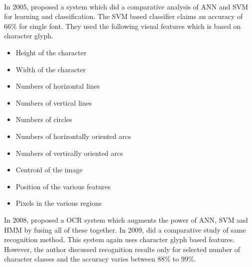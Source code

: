 \paragraph{}
In 2005, \cite{seetha} proposed a system which did 
a comparative analysis of ANN and SVM for learning and classification. The SVM based classifier claims an accuracy of 66\% for single font. They used the following 
visual features which is based on character glyph.
\begin{itemize}
\item Height of the character
\item  Width
of the character
\item Numbers of horizontal lines
\item Numbers of vertical lines
\item Numbers of circles
\item Numbers of horizontally oriented arcs
\item Numbers of vertically oriented arcs
\item Centroid of
the image
\item Position of the various features
\item Pixels in the various regions
\end{itemize}


In 2008,\cite{jaga1} proposed a OCR system which augments the power of ANN, SVM and HMM by fusing all of these together. 
In 2009, \cite{jaga2} did a comparative study of same recognition method. This system again uses character glyph based features. However, the author discussed recognition results only for selected number of character classes and the accuracy varies between 88\% to 99\%.
